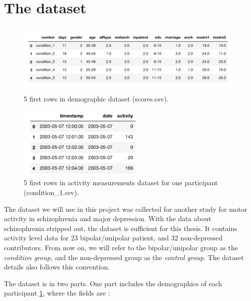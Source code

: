 \section{The dataset}

\begin{figure}
    \begin{center}
        \includegraphics[height=3.5cm]{img/demographics.png}
        \caption{5 first rows in demographic dataset (scores.csv).}
        \label{figure:demographics}
    \end{center}
\end{figure}

\begin{figure}
    \begin{center}
        \includegraphics[height=3.5cm]{img/participant.png}
        \caption{5 first rows in activity measurements dataset for one participant (condition\_1.csv).}
        \label{figure:participant_activity}
    \end{center}
\end{figure}

The dataset we will use in this project was collected for another study for motor activity in schizophrenia and major depression. With the data about schizophrenia stripped out, the dataset is sufficient for this thesis. It contains activity level data for 23 bipolar/unipolar patient, and 32 non-depressed contributors. From now on, we will refer to the bipolar/unipolar group as the \textit{condition group}, and the non-depressed group as the \textit{control group}. The dataset details \cite{dataset_details} also follows this convention.

The dataset is in two parts. One part includes the demographics of each participant \ref{figure:demographics}, where the fields are \cite{dataset_details}:

